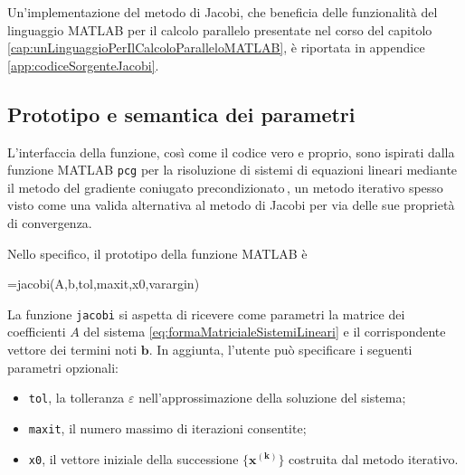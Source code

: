 Un'implementazione del metodo di Jacobi, che beneficia delle funzionalit\`a del linguaggio MATLAB per il
calcolo parallelo presentate nel corso del capitolo \ref{cap:unLinguaggioPerIlCalcoloParalleloMATLAB}, \`e riportata in appendice \ref{app:codiceSorgenteJacobi}.

\subsection{Prototipo e semantica dei parametri}
L'interfaccia della funzione, cos\`i come il codice vero e proprio, sono ispirati dalla funzione MATLAB
\lstinline{pcg} per la risoluzione di sistemi di equazioni lineari mediante il metodo del gradiente coniugato precondizionato\,\cite{TheMathWorksincPcgSolveSystem},
un metodo iterativo spesso visto come una valida alternativa al metodo di Jacobi per via delle sue propriet\`a di convergenza.

Nello specifico, il prototipo della funzione MATLAB \`e
\begin{matlabcode}
    =jacobi(A,b,tol,maxit,x0,varargin)
\end{matlabcode}
La funzione \lstinline{jacobi} si aspetta di ricevere come parametri la matrice dei coefficienti $A$ del sistema \eqref{eq:formaMatricialeSistemiLineari} e il corrispondente vettore dei termini noti $\mathbf{b}$.\newline
In aggiunta, l'utente pu\`o specificare i seguenti parametri opzionali:
\begin{itemize}
    \item \lstinline{tol}, la tolleranza $\varepsilon$ nell'approssimazione della soluzione del sistema;
    \item \lstinline{maxit}, il numero massimo di iterazioni consentite;
    \item \lstinline{x0}, il vettore iniziale della successione $\mathbf{\{x^{(k)}\}}$ costruita dal metodo iterativo.
\end{itemize}

